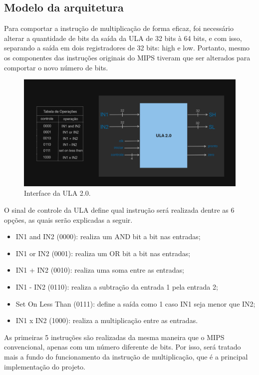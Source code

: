 \documentclass[conference]{IEEEtran}
\begin{document}
\subsection{Modelo da arquitetura}
Para comportar a instrução de multiplicação de forma eficaz, foi necessário alterar a quantidade de bits da saída da ULA de 32 bits à 64 bits, e com isso, separando a saída em dois registradores de 32 bits: high e low. Portanto, mesmo os componentes das instruções originais do MIPS tiveram que ser alterados para comportar o novo número de bits.

\begin{figure}[htbp]
\centerline{\includegraphics[scale=0.3]{ula_interface.png}}
\caption{Interface da ULA 2.0.}
\label{fig}
\end{figure}

O sinal de controle da ULA define qual instrução será realizada dentre as 6 opções, as quais serão explicadas a seguir.
\begin{itemize}
    \item IN1 and IN2 (0000): realiza um AND bit a bit nas entradas;
    \item IN1 or IN2 (0001):  realiza um OR bit a bit nas entradas;
    \item IN1 + IN2 (0010): realiza uma soma entre as entradas;
    \item IN1 - IN2 (0110): realiza a subtração da entrada 1 pela entrada 2;
    \item Set On Less Than (0111): define a saída como 1 caso IN1 seja menor que IN2;
    \item IN1 x IN2 (1000): realiza a multiplicação entre as entradas.
\end{itemize}

As primeiras 5 instruções são realizadas da mesma maneira que o MIPS convencional, apenas com um número diferente de bits. Por isso, será tratado mais a fundo do funcionamento da instrução de multiplicação, que é a principal implementação do projeto.
\end{document}
